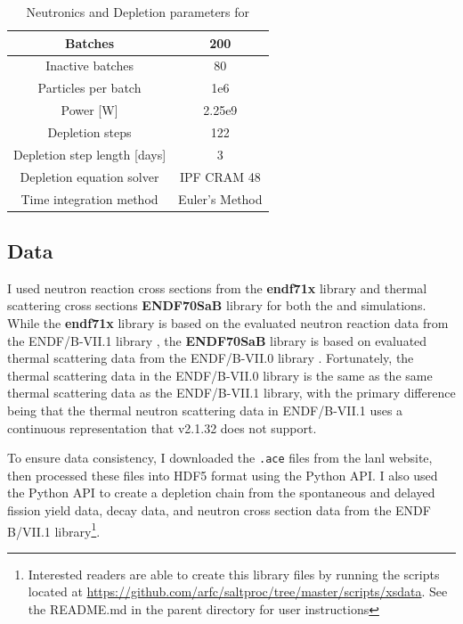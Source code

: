 \begin{table}[htpb] 
    \centering 
    \caption{Neutronics and Depletion parameters for \SaltProc}
    \label{tab:saltproc-params}
    \begin{tabular}{|c|c|} 
        \hline
        Batches & 200 \\
        \hline
        Inactive batches & 80 \\
        \hline
        Particles per batch & 1e6 \\
        \hline
        Power [W] & 2.25e9 \\
        \hline
        Depletion steps & 122 \\
        \hline
        Depletion step length [days] & 3 \\
        \hline
        Depletion equation solver & IPF CRAM 48 \\
        \hline
        Time integration method & Euler's Method \\
        \hline
    \end{tabular}
\end{table}

\subsection{Data}
\label{sub:results-xs-data}

I used neutron reaction cross sections from the {\bf endf71x} \cite{conlin_continuous_2013} library and
thermal scattering cross sections {\bf ENDF70SaB} \cite{trellue_release_2008} library
for both the \SerpentTWO and \OpenMC simulations. While the
{\bf endf71x} library is based on the evaluated neutron reaction data from the ENDF/B-VII.1 library \cite{chadwick_endf/b-vii.1_2011},
the {\bf ENDF70SaB} library is based on evaluated thermal scattering data from the ENDF/B-VII.0 library \cite{chadwick_endfb-vii0_2006}.
Fortunately, the thermal scattering data in the ENDF/B-VII.0 library is the same as the same thermal
scattering data as the ENDF/B-VII.1 library, with the primary difference being that the thermal
neutron scattering data in ENDF/B-VII.1 uses a continuous representation
that \SerpentTWO v2.1.32 does not support.

To ensure data consistency, I downloaded the \verb,.ace, files from the \Gls{lanl}
website, then processed these files into HDF5 format using the \OpenMC Python
API. I also used the Python API to create a depletion chain from the
spontaneous and delayed fission yield data, decay data, and neutron cross
section data from the ENDF B/VII.1 library\footnote{Interested readers are able to
create this library files by running the scripts located at
\url{https://github.com/arfc/saltproc/tree/master/scripts/xsdata}. See
the README.md in the parent directory for user instructions}.

